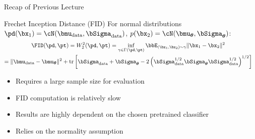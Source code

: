 \documentclass{beamer}
\begin{document}
\begin{frame}
	\titlepage
	\resetonslide	
\end{frame}
\begin{frame}{Recap of Previous Lecture}
	\vspace{-0.3cm}
	\begin{block}{Frechet Inception Distance (FID)}
		For normal distributions $\pd(\bx_1) = \cN(\bmu_{\text{data}}, \bSigma_{\text{data}})$, $p(\bx_2) = \cN(\bmu_{\boldsymbol{\theta}}, \bSigma_{\boldsymbol{\theta}})$:
		\vspace{-0.3cm}
		\begin{multline*}
			\FID (\pd, \pt) =  W_2^2(\pd, \pt) = \inf_{\gamma \in \Gamma(\pd, \pt)} \bbE_{(\bx_1, \bx_2) \sim \gamma} \| \bx_1 - \bx_2 \|^2 \\
			= \| \bmu_{\text{data}} - \bmu_{\boldsymbol{\theta}}\|^2 + \text{tr} \left[ \bSigma_{\text{data}} + \bSigma_{\boldsymbol{\theta}} - 2 \left(\bSigma_{\text{data}}^{1/2} \bSigma_{\boldsymbol{\theta}} \bSigma_{\text{data}}^{1/2} \right)^{1/2} \right]
		\end{multline*}
		\vspace{-0.4cm}
	\end{block}
	\begin{itemize}
		\item Requires a large sample size for evaluation
		\item FID computation is relatively slow
		\item Results are highly dependent on the chosen pretrained classifier
		\item Relies on the normality assumption
	\end{itemize}
\end{frame}
\end{document}
